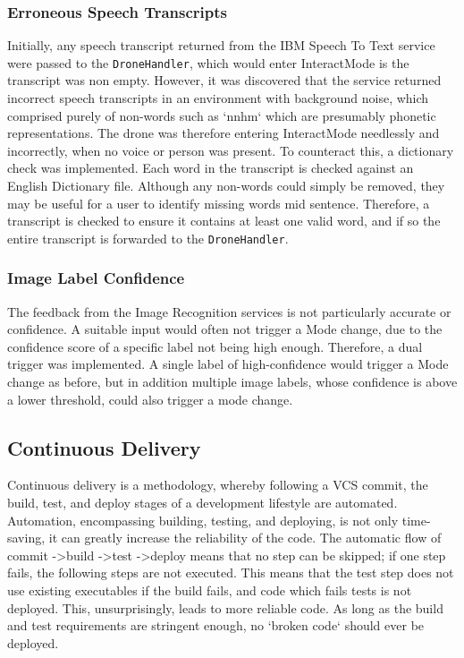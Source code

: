 \documentclass{article}
\begin{document}
\subsubsection{Erroneous Speech Transcripts}
Initially, any speech transcript returned from the IBM Speech To Text service were passed to the \texttt{DroneHandler}, which would enter InteractMode is the transcript was non empty. However, it was discovered that the service returned incorrect speech transcripts in an environment with background noise, which comprised purely of non-words such as `nnhm` which are presumably phonetic representations. The drone was therefore entering InteractMode needlessly and incorrectly, when no voice or person was present. To counteract this, a dictionary check was implemented. Each word in the transcript is checked against an English Dictionary file. Although any non-words could simply be removed, they may be useful for a user to identify missing words mid sentence. Therefore, a transcript is checked to ensure it contains at least one valid word, and if so the entire transcript is forwarded to the \texttt{DroneHandler}. 

\subsubsection{Image Label Confidence}
The feedback from the Image Recognition services is not particularly accurate or confidence. A suitable input would often not trigger a Mode change, due to the confidence score of a specific label not being high enough. Therefore, a dual trigger was implemented. A single label of high-confidence would trigger a Mode change as before, but in addition multiple image labels, whose confidence is above a lower threshold, could also trigger a mode change.

\subsection{Continuous Delivery} \label{ContinuousDelivery}
Continuous delivery is a methodology, whereby following a VCS commit, the build, test, and deploy stages of a development lifestyle are automated. Automation, encompassing building, testing, and deploying, is not only time-saving, it can greatly increase the reliability of the code. The automatic flow of commit -\textgreater build -\textgreater test -\textgreater deploy means that no step can be skipped; if one step fails, the following steps are not executed. This means that the test step does not use existing executables if the build fails, and code which fails tests is not deployed. This, unsurprisingly, leads to more reliable code. As long as the build and test requirements are stringent enough, no `broken code` should ever be deployed\cite{co475}.
\end{document}
